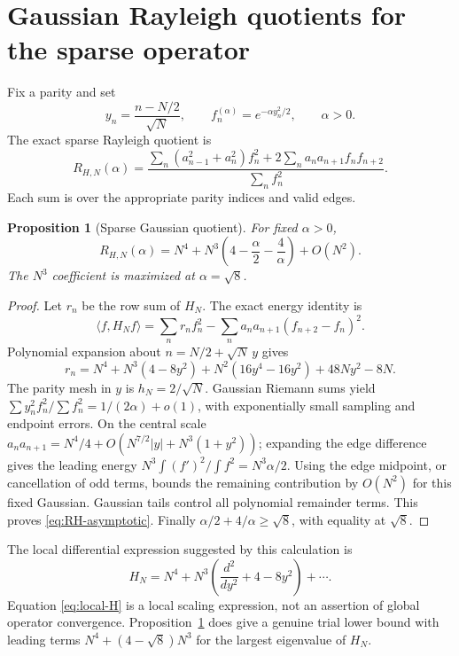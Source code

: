 \documentclass[11pt,reqno]{amsart}
\newtheorem{proposition}[theorem]{Proposition}
\theoremstyle{definition}\newtheorem{definition}[theorem]{Definition}
\theoremstyle{remark}\newtheorem{remark}[theorem]{Remark}
\newcommand{\ip}[2]{\langle #1,#2\rangle}
\begin{document}
\section{Gaussian Rayleigh quotients for the sparse operator}
Fix a parity and set
\begin{equation}\label{eq:trial}
y_n=\frac{n-N/2}{\sqrt N},\qquad
f_n^{(\alpha)}=e^{-\alpha y_n^2/2},\qquad \alpha>0.
\end{equation}
The exact sparse Rayleigh quotient is
\begin{equation}\label{eq:RH-exact}
R_{H,N}(\alpha)=
\frac{\sum_n(a_{n-1}^2+a_n^2)f_n^2
+2\sum_n a_na_{n+1}f_nf_{n+2}}{\sum_n f_n^2}.
\end{equation}
Each sum is over the appropriate parity indices and valid edges.

\begin{proposition}[Sparse Gaussian quotient]\label{prop:RH}
For fixed $\alpha>0$,
\begin{equation}\label{eq:RH-asymptotic}
R_{H,N}(\alpha)=N^4+N^3\left(4-\frac\alpha2-\frac4\alpha\right)+O(N^2).
\end{equation}
The $N^3$ coefficient is maximized at $\alpha=\sqrt8$.
\end{proposition}
\begin{proof}
Let $r_n$ be the row sum of $H_N$. The exact energy identity is
\[
\ip f{H_Nf}=\sum_n r_nf_n^2
-\sum_n a_na_{n+1}(f_{n+2}-f_n)^2.
\]
Polynomial expansion about $n=N/2+\sqrt N\,y$ gives
\[
r_n=N^4+N^3(4-8y^2)
+N^2(16y^4-16y^2)+48Ny^2-8N.
\]
The parity mesh in $y$ is $h_N=2/\sqrt N$.
Gaussian Riemann sums yield
$\sum y_n^2f_n^2/\sum f_n^2=1/(2\alpha)+o(1)$,
with exponentially small sampling and endpoint errors. On the central
scale $a_na_{n+1}=N^4/4+O(N^{7/2}|y|+N^3(1+y^2))$;
expanding the edge difference gives the leading energy
$N^3\int(f')^2/\int f^2=N^3\alpha/2$.
Using the edge midpoint, or cancellation of odd terms, bounds the
remaining contribution by $O(N^2)$ for this fixed Gaussian.
Gaussian tails control all polynomial remainder terms.
This proves \eqref{eq:RH-asymptotic}.
Finally $\alpha/2+4/\alpha\ge\sqrt8$, with equality at $\sqrt8$.
\end{proof}
The local differential expression suggested by this calculation is
\begin{equation}\label{eq:local-H}
H_N=N^4+N^3\left(\frac{d^2}{dy^2}+4-8y^2\right)+\cdots.
\end{equation}
Equation \eqref{eq:local-H} is a local scaling expression, not an
assertion of global operator convergence. Proposition~\ref{prop:RH}
does give a genuine trial lower bound with leading terms
$N^4+(4-\sqrt8)N^3$ for the largest eigenvalue of $H_N$.
\end{document}
